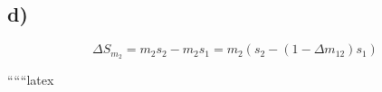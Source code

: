 

\subsection*{d)}
\[
\Delta S_{m_2} = m_2 s_2 - m_2 s_1 = m_2 \left( s_2 - (1 - \Delta m_{12}) s_1 \right)
\]

``````latex